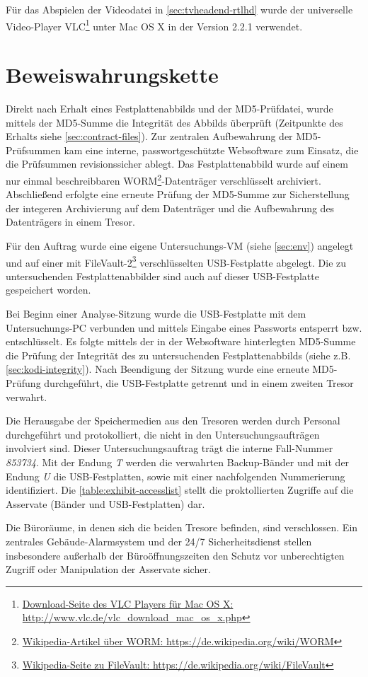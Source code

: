 Für das Abspielen der Videodatei in \autoref{sec:tvheadend-rtlhd} wurde der universelle Video-Player VLC\footnote{\href{http://www.vlc.de/vlc\_download\_mac\_os\_x.php}{Download-Seite des VLC Players für Mac OS X: http://www.vlc.de/vlc\_download\_mac\_os\_x.php}} unter Mac OS X in der Version 2.2.1 verwendet.

\section{Beweiswahrungskette}
\label{sec:cod}

Direkt nach Erhalt eines Festplattenabbilds und der MD5-Prüfdatei, wurde mittels der MD5-Summe die Integrität des Abbilds überprüft (Zeitpunkte des Erhalts siehe \autoref{sec:contract-files}). Zur zentralen Aufbewahrung der MD5-Prüfsummen kam eine interne, passwortgeschützte Websoftware zum Einsatz, die die Prüfsummen revisionssicher ablegt. Das Festplattenabbild wurde auf einem nur einmal beschreibbaren WORM\footnote{\href{https://de.wikipedia.org/wiki/WORM}{Wikipedia-Artikel über WORM: https://de.wikipedia.org/wiki/WORM}}-Datenträger verschlüsselt archiviert. Abschließend erfolgte eine erneute Prüfung der MD5-Summe zur Sicherstellung der integeren Archivierung auf dem Datenträger und die Aufbewahrung des Datenträgers in einem Tresor.

Für den Auftrag wurde eine eigene Untersuchungs-VM (siehe \autoref{sec:env}) angelegt und auf einer mit FileVault-2\footnote{\href{https://de.wikipedia.org/wiki/FileVault}{Wikipedia-Seite zu FileVault: https://de.wikipedia.org/wiki/FileVault}} verschlüsselten USB-Festplatte abgelegt. Die zu untersuchenden Festplattenabbilder sind auch auf dieser USB-Festplatte gespeichert worden.

Bei Beginn einer Analyse-Sitzung wurde die USB-Festplatte mit dem Untersuchungs-PC verbunden und mittels Eingabe eines Passworts entsperrt bzw. entschlüsselt. Es folgte  mittels der in der Websoftware hinterlegten MD5-Summe die Prüfung der Integrität des zu untersuchenden Festplattenabbilds (siehe z.B. \autoref{sec:kodi-integrity}). Nach Beendigung der Sitzung wurde eine erneute MD5-Prüfung durchgeführt, die USB-Festplatte getrennt und in einem zweiten Tresor verwahrt.

Die Herausgabe der Speichermedien aus den Tresoren werden durch Personal durchgeführt und protokolliert, die nicht in den Untersuchungsaufträgen involviert sind. Dieser Untersuchungsauftrag trägt die interne Fall-Nummer \textit{853734}. Mit der Endung \textit{T} werden die verwahrten Backup-Bänder und mit der Endung \textit{U} die USB-Festplatten, sowie mit einer nachfolgenden Nummerierung identifiziert. Die \autoref{table:exhibit-accesslist} stellt die proktollierten Zugriffe auf die Asservate (Bänder und USB-Festplatten) dar.

Die Büroräume, in denen sich die beiden Tresore befinden, sind verschlossen. Ein zentrales Gebäude-Alarmsystem und der 24/7 Sicherheitsdienst stellen insbesondere außerhalb der Büroöffnungszeiten den Schutz vor unberechtigten Zugriff oder Manipulation der Asservate sicher.